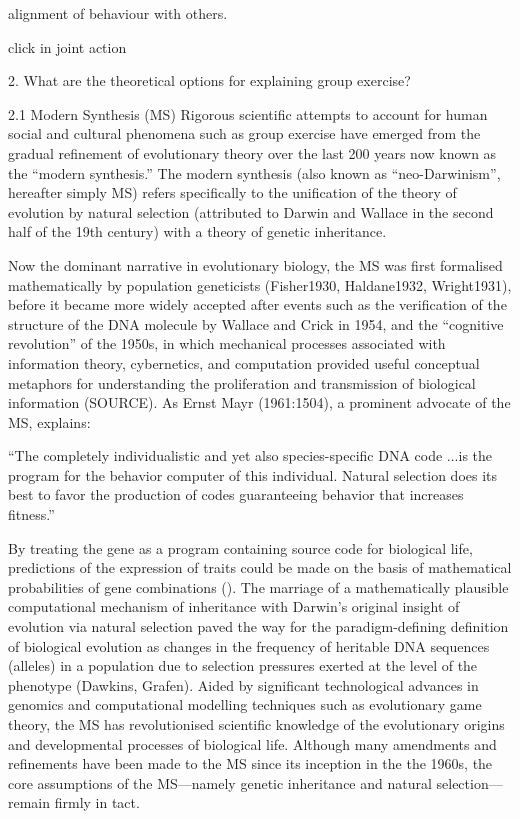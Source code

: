 alignment of behaviour with others.

click in joint action






2.   What are the theoretical options for explaining group exercise?

2.1 Modern Synthesis (MS)
Rigorous scientific attempts to account for human social and cultural phenomena such as group exercise have emerged from the gradual refinement of evolutionary theory over the last 200 years now known as the ``modern synthesis.''  The modern synthesis (also known as ``neo-Darwinism'', hereafter simply MS) refers specifically to the unification of the theory of evolution by natural selection (attributed to Darwin and Wallace in the second half of the 19th century) with a theory of genetic inheritance.

Now the dominant narrative in evolutionary biology, the MS was first formalised mathematically by population geneticists (Fisher1930, Haldane1932, Wright1931), before it became more widely accepted after events such as the verification of the structure of the DNA molecule by Wallace and Crick in 1954, and the ``cognitive revolution'' of the 1950s, in which mechanical processes associated with information theory, cybernetics, and computation provided useful conceptual metaphors for understanding the proliferation and transmission of biological information (SOURCE).  As Ernst Mayr (1961:1504), a prominent advocate of the MS, explains:

``The completely individualistic and yet also species-specific DNA code ...is the program for the behavior computer of this individual. Natural selection does its best to favor the production of codes guaranteeing behavior that increases fitness.''

By treating the gene as a program containing source code for biological life, predictions of the expression of traits could be made on the basis of mathematical probabilities of gene combinations (\citep{Dawkins1972;Dawkins1982}). The marriage of a mathematically plausible computational mechanism of inheritance with Darwin's original insight of evolution via natural selection paved the way for the paradigm-defining definition of biological evolution as changes in the frequency of heritable DNA sequences (alleles) in a population due to selection pressures exerted at the level of the phenotype (Dawkins, Grafen). Aided by significant technological advances in genomics and computational modelling techniques such as evolutionary game theory, the MS has revolutionised scientific knowledge of the evolutionary origins and developmental processes of biological life.  Although many amendments and refinements have been made to the MS since its inception in the the 1960s, the core assumptions of the MS---namely genetic inheritance and natural selection---remain firmly in tact.


